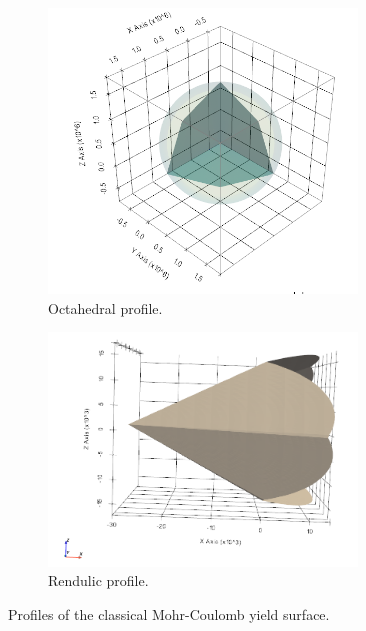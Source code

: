 \begin{figure}[htbp!]
  \begin{subfigure}[t]{0.5\textwidth}
    \centering
    \includegraphics[width=0.9\textwidth]{Figs/mohr_coulomb/MC_octahedral_profile.png}
    \caption{Octahedral profile.}
  \end{subfigure}
  \begin{subfigure}[t]{0.5\textwidth}
    \centering
    \includegraphics[width=0.9\textwidth]{Figs/mohr_coulomb/MC_rendulic.png}
    \caption{Rendulic profile.}
  \end{subfigure}
  \caption{Profiles of the classical Mohr-Coulomb yield surface.}
  \label{fig:MC}
\end{figure}


